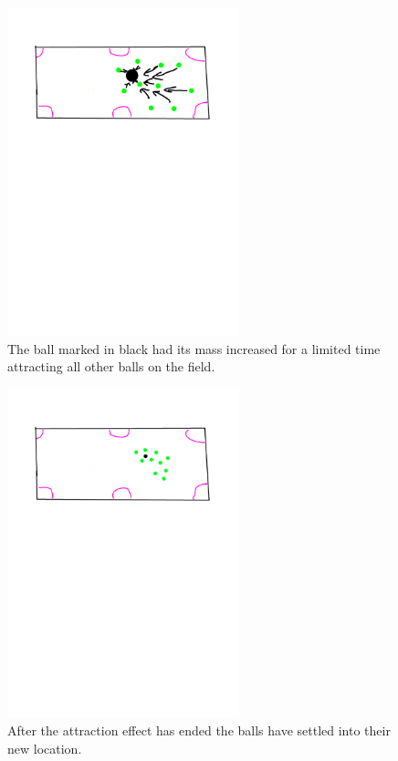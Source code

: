 \documentclass{article}
\begin{document}
\begin{figure}[!htb]
	\centering
	\includegraphics[trim={2cm 17cm 2cm 2cm},width=0.6\textwidth,clip]{img/game_state_2.png}
	\caption{The ball marked in black had its mass increased for a limited time attracting all other balls on the field.}
	\label{fig:game_state_2}
\end{figure}

\begin{figure}[!htb]
	\centering
	\includegraphics[trim={2cm 17cm 2cm 2cm},width=0.6\textwidth,clip]{img/game_state_3.png}
	\caption{After the attraction effect has ended the balls have settled into their new location.}
	\label{fig:game_state_3}
\end{figure}
\end{document}
